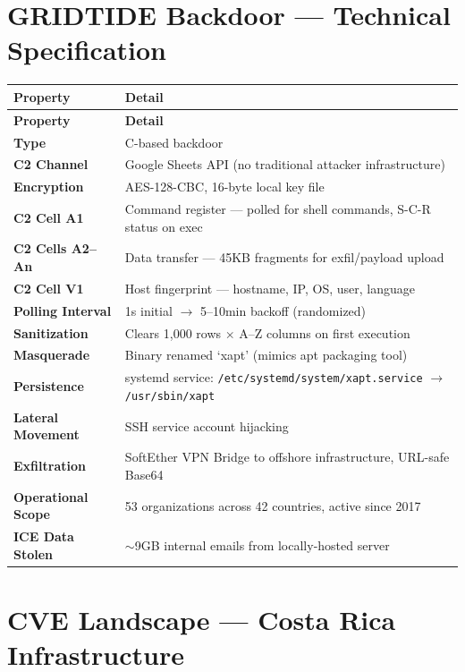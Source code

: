 \documentclass[11pt,a4paper]{article}
\begin{document}
\section{GRIDTIDE Backdoor --- Technical Specification}

\begin{longtable}{@{} >{\bfseries}p{4cm} p{10cm} @{}}
\toprule
\textbf{Property} & \textbf{Detail} \\
\midrule
\endfirsthead
\toprule
\textbf{Property} & \textbf{Detail} \\
\midrule
\endhead
Type & C-based backdoor \\
C2 Channel & Google Sheets API (no traditional attacker infrastructure) \\
Encryption & AES-128-CBC, 16-byte local key file \\
C2 Cell A1 & Command register --- polled for shell commands, S-C-R status on exec \\
C2 Cells A2--An & Data transfer --- 45KB fragments for exfil/payload upload \\
C2 Cell V1 & Host fingerprint --- hostname, IP, OS, user, language \\
Polling Interval & 1s initial $\rightarrow$ 5--10min backoff (randomized) \\
Sanitization & Clears 1,000 rows $\times$ A--Z columns on first execution \\
Masquerade & Binary renamed `xapt' (mimics apt packaging tool) \\
Persistence & systemd service: \texttt{/etc/systemd/system/xapt.service} $\rightarrow$ \texttt{/usr/sbin/xapt} \\
Lateral Movement & SSH service account hijacking \\
Exfiltration & SoftEther VPN Bridge to offshore infrastructure, URL-safe Base64 \\
Operational Scope & 53 organizations across 42 countries, active since 2017 \\
ICE Data Stolen & $\sim$9GB internal emails from locally-hosted server \\
\bottomrule
\end{longtable}

\section{CVE Landscape --- Costa Rica Infrastructure}
\end{document}
